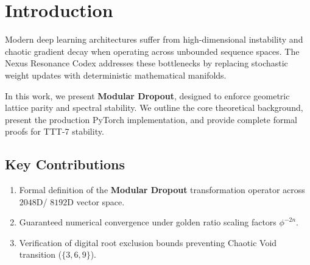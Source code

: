 \section{Introduction}
Modern deep learning architectures suffer from high-dimensional instability and chaotic gradient decay when operating across unbounded sequence spaces. The Nexus Resonance Codex addresses these bottlenecks by replacing stochastic weight updates with deterministic mathematical manifolds.

In this work, we present \textbf{Modular Dropout}, designed to enforce geometric lattice parity and spectral stability. We outline the core theoretical background, present the production PyTorch implementation, and provide complete formal proofs for TTT-7 stability.

\subsection{Key Contributions}
\begin{enumerate}[label=\textbf{\arabic*.}]
    \item Formal definition of the \textbf{Modular Dropout} transformation operator across $2048$D/ $8192$D vector space.
    \item Guaranteed numerical convergence under golden ratio scaling factors $\phi^{-2n}$.
    \item Verification of digital root exclusion bounds preventing Chaotic Void transition ($\{3, 6, 9\}$).
\end{enumerate}